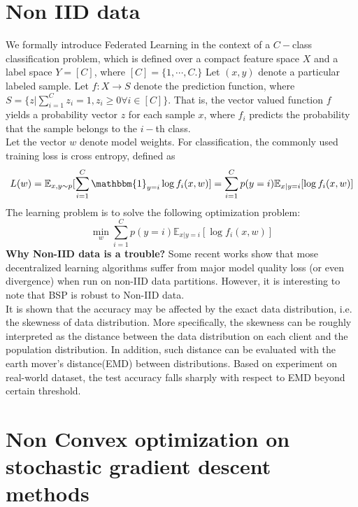 \documentclass{article}
\theoremstyle{theorem}
\theoremstyle{definition}
\begin{document}
	\section{Non IID data}
	We formally introduce Federated Learning in the context of a $C-$class
	classification problem, which is defined over a compact feature
	space $X$ and a label space $Y = [C]$, where $[C]=\{1, \cdots , C.\}$
	Let $(x, y)$ denote a particular labeled sample. Let $f : X  \rightarrow S$ denote the prediction function, where $S=\{z | \sum_{i=1}^C z_i =1 , z_i \geq 0 \forall i \in [C]\}$. That is, the vector valued function $f$ yields a probability vector $z$ for each sample $x$, where $f_i$ predicts the probability that the sample belongs to the $i-$th class.\\
	Let the vector $w$ denote model weights. For classification,
	the commonly used training loss is cross entropy, defined as
	$$L(w) =\mathbb{E}_{x,y \sim p} [\sum_{i=1}^C \mathbbm{1}_{y=i} \log  f_i(x,w) ]=\sum_{i=1}^{C} p(y=i) \mathbb{E}_{x|y=i}[\log f_i(x,w)] $$
	The learning problem is to solve the following optimization
	problem:
	$$\min_{w} \sum_{i=1}^{C} p(y=i) \mathbb{E}_{x|y=i}[\log f_i(x,w)]$$
	\textbf{Why Non-IID data is a trouble?}
	Some recent works show that mose decentralized learning algorithms suffer from major model quality loss (or even divergence) when run on non-IID data partitions. However, it is interesting to note that BSP is robust to Non-IID data.\\
	It is shown that the accuracy may be affected by the exact data distribution, i.e. the skewness of data distribution. More specifically, the skewness can be roughly interpreted as the distance between the data distribution on each client and the population distribution. In addition, such distance can be evaluated with the earth mover's distance(EMD) between distributions. Based on experiment on real-world dataset, the test accuracy falls sharply with respect to EMD beyond certain threshold. 
	\section{Non Convex optimization on stochastic gradient descent methods}
\end{document}
